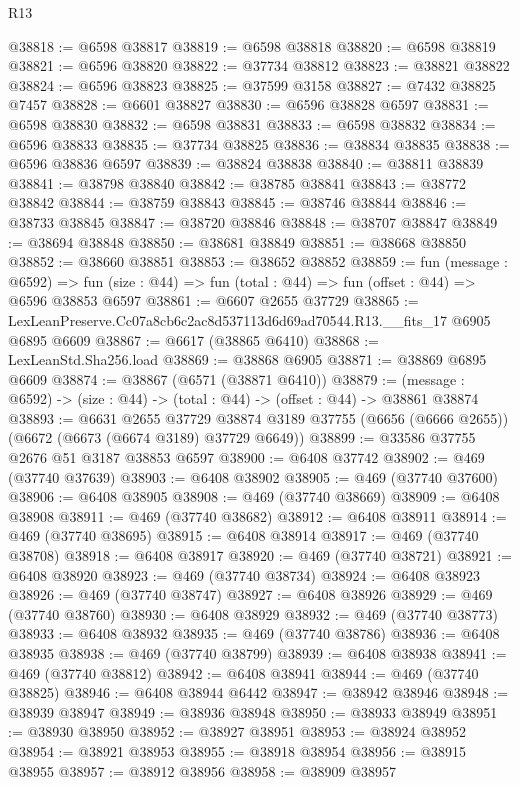 \begin{lexlean}{R13}
\begin{coremodule}
@38818 := @6598 @38817
@38819 := @6598 @38818
@38820 := @6598 @38819
@38821 := @6596 @38820
@38822 := @37734 @38812
@38823 := @38821 @38822
@38824 := @6596 @38823
@38825 := @37599 @3158
@38827 := @7432 @38825 @7457
@38828 := @6601 @38827
@38830 := @6596 @38828 @6597
@38831 := @6598 @38830
@38832 := @6598 @38831
@38833 := @6598 @38832
@38834 := @6596 @38833
@38835 := @37734 @38825
@38836 := @38834 @38835
@38838 := @6596 @38836 @6597
@38839 := @38824 @38838
@38840 := @38811 @38839
@38841 := @38798 @38840
@38842 := @38785 @38841
@38843 := @38772 @38842
@38844 := @38759 @38843
@38845 := @38746 @38844
@38846 := @38733 @38845
@38847 := @38720 @38846
@38848 := @38707 @38847
@38849 := @38694 @38848
@38850 := @38681 @38849
@38851 := @38668 @38850
@38852 := @38660 @38851
@38853 := @38652 @38852
@38859 := fun (message : @6592) =>
  fun (size : @44) => fun (total : @44) => fun (offset : @44) => @6596 @38853 @6597
@38861 := @6607 @2655 @37729
@38865 := LexLeanPreserve.Cc07a8cb6c2ac8d537113d6d69ad70544.R13.__fits_17 @6905 @6895 @6609
@38867 := @6617 (@38865 @6410)
@38868 := LexLeanStd.Sha256.load
@38869 := @38868 @6905
@38871 := @38869 @6895 @6609
@38874 := @38867 (@6571 (@38871 @6410))
@38879 := (message : @6592) -> (size : @44) -> (total : @44) -> (offset : @44) -> @38861 @38874
@38893 := @6631
    @2655
    @37729
    @38874
    @3189
    @37755
    (@6656 (@6666 @2655))
    (@6672 (@6673 (@6674 @3189) @37729 @6649))
@38899 := @33586 @37755 @2676 @51 @3187 @38853 @6597
@38900 := @6408 @37742
@38902 := @469 (@37740 @37639)
@38903 := @6408 @38902
@38905 := @469 (@37740 @37600)
@38906 := @6408 @38905
@38908 := @469 (@37740 @38669)
@38909 := @6408 @38908
@38911 := @469 (@37740 @38682)
@38912 := @6408 @38911
@38914 := @469 (@37740 @38695)
@38915 := @6408 @38914
@38917 := @469 (@37740 @38708)
@38918 := @6408 @38917
@38920 := @469 (@37740 @38721)
@38921 := @6408 @38920
@38923 := @469 (@37740 @38734)
@38924 := @6408 @38923
@38926 := @469 (@37740 @38747)
@38927 := @6408 @38926
@38929 := @469 (@37740 @38760)
@38930 := @6408 @38929
@38932 := @469 (@37740 @38773)
@38933 := @6408 @38932
@38935 := @469 (@37740 @38786)
@38936 := @6408 @38935
@38938 := @469 (@37740 @38799)
@38939 := @6408 @38938
@38941 := @469 (@37740 @38812)
@38942 := @6408 @38941
@38944 := @469 (@37740 @38825)
@38946 := @6408 @38944 @6442
@38947 := @38942 @38946
@38948 := @38939 @38947
@38949 := @38936 @38948
@38950 := @38933 @38949
@38951 := @38930 @38950
@38952 := @38927 @38951
@38953 := @38924 @38952
@38954 := @38921 @38953
@38955 := @38918 @38954
@38956 := @38915 @38955
@38957 := @38912 @38956
@38958 := @38909 @38957

\end{coremodule}
\end{lexlean}
